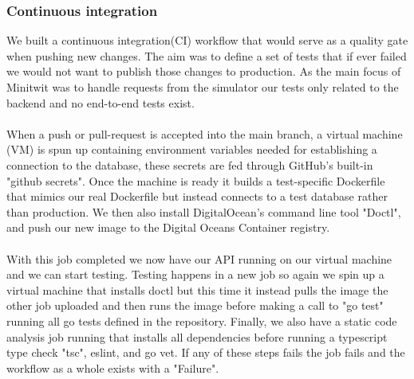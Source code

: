 \subsubsection{Continuous integration}\label{subsubsec:ci}
We built a continuous integration(CI) workflow\cite{DevOps-CI-CDont} that would serve as a quality gate when pushing new changes. The aim was to define a set of tests that if ever failed we would not want to publish those changes to production. As the main focus of Minitwit was to handle requests from the simulator our tests only related to the backend and no end-to-end tests exist.\\\\
When a push or pull-request is accepted into the main branch, a virtual machine (VM) is spun up containing environment variables needed for establishing a connection to the database, these secrets are fed through GitHub's built-in "github secrets"\cite{GitHub-Secrets}. Once the machine is ready it builds a test-specific Dockerfile that mimics our real Dockerfile but instead connects to a test database rather than production. We then also install DigitalOcean's command line tool "Doctl"\cite{DigitalOcean-doctl}, and push our new image to the Digital Oceans Container registry.\\\\
With this job completed we now have our API running on our virtual machine and we can start testing. Testing happens in a new job so again we spin up a virtual machine that installs doctl but this time it instead pulls the image the other job uploaded and then runs the image before making a call to "go test" running all go tests defined in the repository. Finally, we also have a static code analysis job running that installs all dependencies before running a typescript type check "tsc", eslint, and go vet. If any of these steps fails the job fails and the workflow as a whole exists with a "Failure". 
